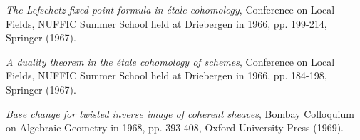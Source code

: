 \begin{description}
\item[{[09]}] \emph{The Lefschetz fixed point formula in étale cohomology},
Conference on Local Fields, NUFFIC Summer School held at Driebergen in 1966,
pp. 199-214, Springer (1967).

\item[{[10]}] \emph{A duality theorem in the étale cohomology of schemes},
Conference on Local Fields, NUFFIC Summer School held at Driebergen in 1966,
pp. 184-198, Springer (1967).

\item[{[11]}] \emph{Base change for twisted inverse image of coherent sheaves},
Bombay Colloquium on Algebraic Geometry in 1968, pp. 393-408, Oxford University
Press (1969).
\end{description}

